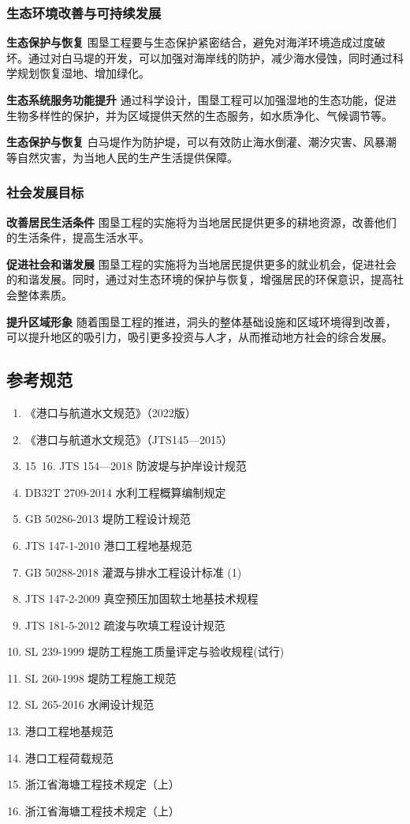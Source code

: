 \documentclass[UTF8, a4paper, 12pt]{ctexart} %
\begin{document}
\subsubsection{生态环境改善与可持续发展}
\textbf{生态保护与恢复}
围垦工程要与生态保护紧密结合，避免对海洋环境造成过度破坏。通过对白马堤的开发，可以加强对海岸线的防护，减少海水侵蚀，同时通过科学规划恢复湿地、增加绿化。
\par \textbf{生态系统服务功能提升}
通过科学设计，围垦工程可以加强湿地的生态功能，促进生物多样性的保护，并为区域提供天然的生态服务，如水质净化、气候调节等。
\par \textbf{生态保护与恢复}
白马堤作为防护堤，可以有效防止海水倒灌、潮汐灾害、风暴潮等自然灾害，为当地人民的生产生活提供保障。
\subsubsection{社会发展目标}
\par \textbf{改善居民生活条件}
围垦工程的实施将为当地居民提供更多的耕地资源，改善他们的生活条件，提高生活水平。
\par \textbf{促进社会和谐发展}
围垦工程的实施将为当地居民提供更多的就业机会，促进社会的和谐发展。同时，通过对生态环境的保护与恢复，增强居民的环保意识，提高社会整体素质。
\par \textbf{提升区域形象}
随着围垦工程的推进，洞头的整体基础设施和区域环境得到改善，可以提升地区的吸引力，吸引更多投资与人才，从而推动地方社会的综合发展。

\subsection{参考规范}
\begin{enumerate}
    
    \item 《港口与航道水文规范》（2022版）
    \item 《港口与航道水文规范》（JTS145—2015）
    \item  15~16. JTS 154—2018 防波堤与护岸设计规范
    \item  DB32T 2709-2014 水利工程概算编制规定
    \item  GB 50286-2013  堤防工程设计规范
    \item JTS 147-1-2010 港口工程地基规范
    \item GB 50288-2018 灌溉与排水工程设计标准 (1)
    \item JTS 147-2-2009 真空预压加固软土地基技术规程
    \item JTS 181-5-2012 疏浚与吹填工程设计规范
    \item SL 239-1999 堤防工程施工质量评定与验收规程(试行)
    \item SL 260-1998 堤防工程施工规范
    \item SL 265-2016 水闸设计规范
    \item 港口工程地基规范
    \item 港口工程荷载规范
    \item 浙江省海塘工程技术规定（上）
    \item 浙江省海塘工程技术规定（上）
    
    \end{enumerate}
\end{document}
